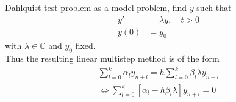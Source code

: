 \begin{frame}[noframenumbering]
	Dahlquist test problem as a model problem, find $y$ such that
	\begin{align}
		y' &= \lambda y, \quad t > 0 \\
		y(0) &= y_0
	\end{align}
	with $\lambda \in \mathbb{C}$ and $y_0$ fixed. \\
	Thus the resulting linear multistep method is of the form
	\begin{align*}
		\sum_{l=0}^{k} \alpha_l y_{n+l} = h \sum_{l=0}^{k} \beta_l \lambda y_{n+l} \\
		\iff \sum_{l=0}^{k}  [\alpha_l - h \beta_l \lambda] y_{n+l} = 0
	\end{align*}
\end{frame}

